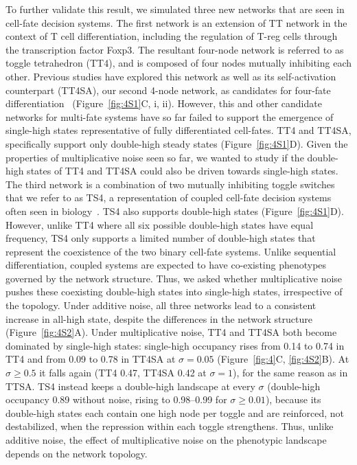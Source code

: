 \documentclass[11pt]{article}
\begin{document}
To further validate this result, we simulated three new networks that are seen in cell-fate decision systems. The first network is an extension of TT network in the context of T cell differentiation, including the regulation of T-reg cells through the transcription factor Foxp3. The resultant four-node network is referred to as toggle tetrahedron (TT4), and is composed of four nodes mutually inhibiting each other. Previous studies have explored this network as well as its self-activation counterpart (TT4SA), our second 4-node network, as candidates for four-fate differentiation~\cite{Duddu2024MultistabilityDifferentiation} (Figure~\ref{fig:4S1}C, i, ii). However, this and other candidate networks for multi-fate systems have so far failed to support the emergence of single-high states representative of fully differentiated cell-fates. TT4 and TT4SA, specifically support only double-high steady states (Figure~\ref{fig:4S1}D). Given the properties of multiplicative noise seen so far, we wanted to study if the double-high states of TT4 and TT4SA could also be driven towards single-high states. The third network is a combination of two mutually inhibiting toggle switches that we refer to as TS4, a representation of coupled cell-fate decision systems often seen in biology~\cite{pasani2020hybrid, hari2022emergent}. TS4 also supports double-high states (Figure~\ref{fig:4S1}D). However, unlike TT4 where all six possible double-high states have equal frequency, TS4 only supports a limited number of double-high states that represent the coexistence of the two binary cell-fate systems. Unlike sequential differentiation, coupled systems are expected to have co-existing phenotypes governed by the network structure. Thus, we asked whether multiplicative noise pushes these coexisting double-high states into single-high states, irrespective of the topology. Under additive noise, all three networks lead to a consistent increase in all-high state, despite the differences in the network structure (Figure~\ref{fig:4S2}A). Under multiplicative noise, TT4 and TT4SA both become dominated by single-high states: single-high occupancy rises from 0.14 to 0.74 in TT4 and from 0.09 to 0.78 in TT4SA at $\sigma = 0.05$ (Figure~\ref{fig:4}C, \ref{fig:4S2}B). At $\sigma \geq 0.5$ it falls again (TT4 0.47, TT4SA 0.42 at $\sigma = 1$), for the same reason as in TTSA. TS4 instead keeps a double-high landscape at every $\sigma$ (double-high occupancy 0.89 without noise, rising to 0.98--0.99 for $\sigma \geq 0.01$), because its double-high states each contain one high node per toggle and are reinforced, not destabilized, when the repression within each toggle strengthens. Thus, unlike additive noise, the effect of multiplicative noise on the phenotypic landscape depends on the network topology.
\end{document}
